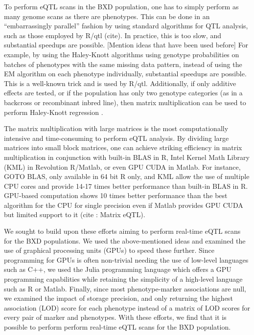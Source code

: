 \documentclass[9pt,twocolumn,twoside,lineno]{gsag3jnl}
\begin{document}
To perform eQTL scans in the BXD population, one has to simply perform
as many genome scans as there are phenotypes.  This can be done in an
``embarrassingly parallel'' fashion by using standard algorithms for
QTL analysis, such as those employed by R/qtl (cite).  In practice,
this is too slow, and substantial speedups are possible.  [Mention
  ideas that have been used before] For example, by using the
Haley-Knott algorithms using genotype probabilities on batches of
phenotypes with the same missing data pattern, instead of using the EM
algorithm on each phenotype individually, substantial speedups are
possible.  This is a well-known trick and is used by R/qtl.
Additionally, if only additive effects are tested, or if the
population has only two genotype categories (as in a backcross or
recombinant inbred line), then matrix multiplication can be used to
perform Haley-Knott regression \citep{shabalin2012matrix}.  

The matrix multiplication with large matrices is the most computationally intensive and time-consuming 
to perform eQTL analysis.  By dividing large matrices into small block matrices, 
one can achieve striking efficiency in matrix multiplication in conjunction with built-in BLAS in R, 
Intel Kernel Math Library (KML) in Revolution R/Matlab, or even GPU CUDA in Matlab.  
For instance, GOTO BLAS, only available in 64 bit R only, and KML allow the use of multiple CPU cores and provide 14-17 times 
better performance than built-in BLAS in R.  GPU-based computation shows 10 times better performance than 
the best algorithm for the CPU for single precision even if Matlab provides GPU CUDA but limited support to it (cite : Matrix eQTL).


We sought to build upon these efforts aiming to perform real-time eQTL
scans for the BXD populations.  We used the above-mentioned ideas and
examined the use of graphical processing units (GPUs) to speed these
further.  Since programming for GPUs is often non-trivial needing the
use of low-level languages such as C++, we used the Julia programming
language which offers a GPU programming capabilities while retaining
the simplicity of a high-level language such as R or Matlab.  Finally,
since most phenotype-marker associations are null, we examined the
impact of storage precision, and only returning the highest
association (LOD) score for each phenotype instead of a matrix of LOD
scores for every pair of marker and phenotypes.  With these efforts,
we find that it is possible to perform perform real-time eQTL scans
for the BXD population.
\end{document}
